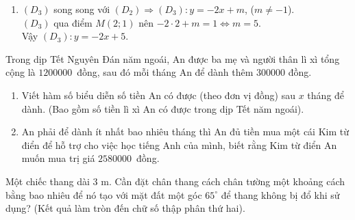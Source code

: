 \begin{bt}
{\begin{enumerate}
\begin{center}
\begin{tikzpicture}[line join=round, line cap=round,>=stealth,scale=.8]
\end{tikzpicture}
\end{center}
\item $(D_3)$ song song với $(D_2)\Rightarrow (D_3)\colon y=-2x+m$, ($m\ne -1$).\\
$(D_3)$ qua điểm $M(2;1)$ nên $-2\cdot 2+m=1\Leftrightarrow m=5$.\\
Vậy $(D_3)\colon y=-2x+5$.
\end{enumerate}
}
\end{bt}

\begin{bt}%
Trong dịp Tết Nguyên Đán năm ngoái, An được ba mẹ và người thân lì xì tổng cộng là $1200000$~đồng, sau đó mỗi tháng An để dành thêm $300000$ đồng.
\begin{enumerate}
\item Viết hàm số biểu diễn số tiền An có được (theo đơn vị đồng) sau $x$ tháng để dành. (Bao gồm số tiền lì xì An có được trong dịp Tết năm ngoái).
\item An phải để dành ít nhất bao nhiêu tháng thì An đủ tiền mua một cái Kim từ điển để hỗ trợ cho việc học tiếng Anh của mình, biết rằng Kim từ điển An muốn mua trị giá $2580000$~đồng.
\end{enumerate}
\end{bt}

\begin{bt}%
Một chiếc thang dài $3$ m. Cần đặt chân thang cách chân tường một khoảng cách bằng bao nhiêu để nó tạo với mặt đất một góc $65^\circ$ để thang không bị đổ khi sử dụng? (Kết quả làm tròn đến chữ số thập phân thứ hai).
\end{bt}


